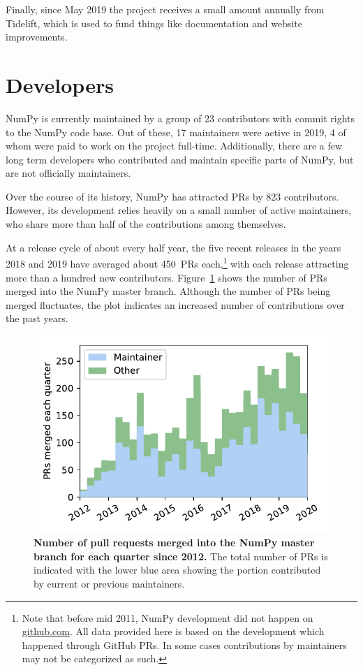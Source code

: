 Finally, since May 2019 the project receives a small amount annually from
Tidelift, which is used to fund things like documentation and website
improvements.


\section*{Developers}

NumPy is currently maintained by a group of 23 contributors with commit rights
to the NumPy code base. Out of these, 17 maintainers were active in
2019, 4 of whom were paid to work on the project full-time.
Additionally, there are a few long term developers who contributed and maintain
specific parts of NumPy, but are not officially maintainers.

Over the course of its history, NumPy has attracted PRs by 823 contributors.
However, its development relies heavily on a small number
of active maintainers, who share more than half of the contributions among
themselves.

At a release cycle of about every half year, the five recent releases in the years
2018 and 2019 have averaged about 450~PRs each,\footnote{
    Note that before mid 2011, NumPy development did not happen on \url{github.com}.
    All data provided here is based on the development which happened through GitHub
    PRs. In some cases contributions by maintainers may not be categorized as such.}
with each release attracting more than a hundred new contributors.
Figure~\ref{fig:prs-over-time} shows the number of PRs merged into the NumPy
master branch.
Although the number of PRs being merged fluctuates,
the plot indicates an increased number of contributions over the past
years.

\begin{figure}
    \centering
    \includegraphics[width=0.9\linewidth]{scripts/PRs-using-CURRENT_MAINTAINERS.pdf}
    \caption{\textbf{Number of pull requests merged into the NumPy master branch for each
        quarter since 2012.} The total number of PRs is indicated with the
        lower blue area showing the portion contributed by current or previous
        maintainers.}\label{fig:prs-over-time}
\end{figure}



